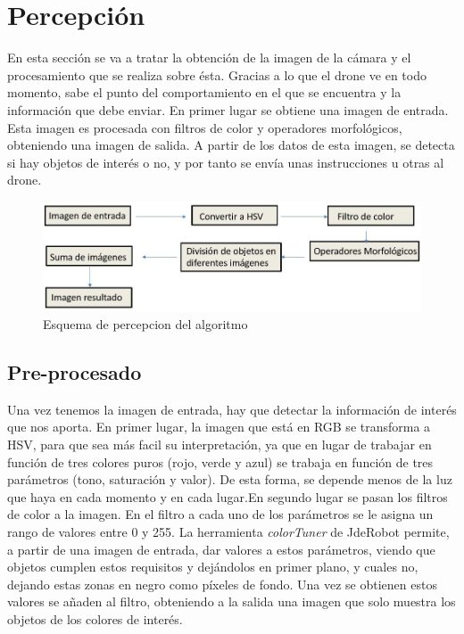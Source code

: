 \section{Percepci\'on}

\hspace{1 cm} En esta secci\'on se va a tratar la obtenci\'on de la imagen de la c\'amara y el procesamiento que se realiza sobre \'esta. Gracias a lo que el drone ve en todo momento, sabe el punto del comportamiento en el que se encuentra y la informaci\'on que debe enviar. En primer lugar se obtiene una imagen de entrada. Esta imagen es procesada con filtros de color y operadores morfol\'ogicos, obteniendo una imagen de salida. A partir de los datos de esta imagen, se detecta si hay objetos de inter\'es o no, y por tanto se env\'ia unas instrucciones u otras al drone. 


\begin{figure}[H]
	\centering
		\includegraphics[width=1\textwidth]{imgs/fig421.jpg}
        \caption{Esquema de percepcion del algoritmo}
	\label{fig:Procesado_percepcion}
\end{figure}

\subsection{Pre-procesado}

\hspace{1 cm} Una vez tenemos la imagen de entrada, hay que detectar la informaci\'on de inter\'es que nos aporta.  En primer lugar, la imagen que est\'a en RGB se transforma a HSV, para que sea m\'as facil su interpretaci\'on, ya que en lugar de trabajar en funci\'on de tres colores puros (rojo, verde y azul) se trabaja en funci\'on de tres par\'ametros (tono, saturaci\'on y valor). De esta forma, se depende menos de la luz que haya en cada momento y en cada lugar.En segundo lugar se pasan los filtros de color a la imagen. En el filtro a cada uno de los par\'ametros se le asigna un rango de valores entre 0 y 255. La herramienta \textit{colorTuner} de JdeRobot permite, a partir de una imagen de entrada, dar valores a estos par\'ametros, viendo que objetos cumplen estos requisitos y dej\'andolos en primer plano, y cuales no, dejando estas zonas en negro como p\'ixeles de fondo. Una vez se obtienen estos valores se añaden al filtro, obteniendo a la salida una imagen que solo muestra los objetos de los colores de inter\'es. 

